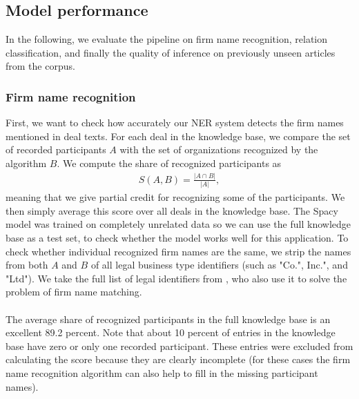 \subsection{Model performance}
\label{sec:performance} 
In the following, we evaluate the pipeline on firm name recognition, relation classification, and finally the quality of inference on previously unseen articles from the corpus.

\subsubsection{Firm name recognition}
First, we want to check how accurately our NER system detects the firm names mentioned in deal texts. For each deal in the knowledge base, we compare the set of recorded participants $A$ with the set of organizations recognized by the algorithm $B$. We compute the share of recognized participants as 
\begin{gather*}
    S(A,B) = \frac{|A \cap B|}{|A|},
\end{gather*}
meaning that we give partial credit for recognizing some of the participants.
We then simply average this score over all deals in the knowledge base. The Spacy model was trained on completely unrelated data so we can use the full knowledge base as a test set, to check whether the model works well for this application. To check whether individual recognized firm names are the same, we strip the names from both $A$ and $B$ of all legal business type identifiers (such as "Co.", Inc.", and "Ltd"). We take the full list of legal identifiers from \citet{schwenkler2019network}, who also use it to solve the problem of firm name matching. \\\\
The average share of recognized participants in the full knowledge base is an excellent 89.2 percent. Note that about 10 percent of entries in the knowledge base have zero or only one recorded participant. These entries were excluded from calculating the score because they are clearly incomplete (for these cases the firm name recognition algorithm can also help to fill in the missing participant names).

